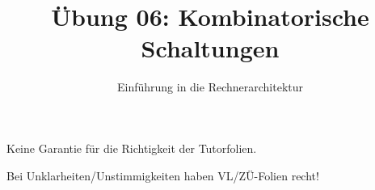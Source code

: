 


\title{Übung 06: Kombinatorische \\Schaltungen}
\subtitle{Einführung in die Rechnerarchitektur}
\date{}



\maketitle

\begin{frame}[c, fragile]{}{}
	\begin{center}
		\LARGE  Keine Garantie für die Richtigkeit der Tutorfolien.

		\Large Bei Unklarheiten/Unstimmigkeiten haben VL/ZÜ-Folien recht!
	\end{center}
\end{frame}

